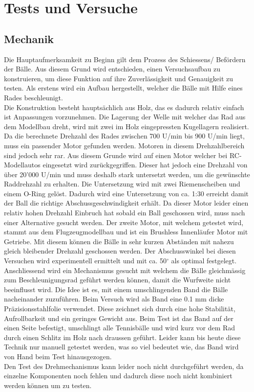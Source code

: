 \section{Tests und Versuche}

\subsection{Mechanik}

Die Hauptaufmerksamkeit zu Beginn gilt dem Prozess des Schiessens/ Befördern 
der Bälle. Aus diesem Grund wird entschieden, einen Versuchsaufbau zu 
konstruieren, um diese Funktion auf ihre Zuverlässigkeit und Genauigkeit zu 
testen. Als erstens wird ein Aufbau hergestellt, welcher die Bälle mit Hilfe 
eines Rades beschleunigt. \\
%
Die Konstruktion besteht hauptsächlich aus Holz, das es dadurch relativ 
einfach ist Anpassungen vorzunehmen. Die Lagerung der Welle mit welcher das 
Rad aus dem Modellbau dreht, wird mit zwei im Holz eingepressten Kugellagern 
realisiert. Da die berechnete Drehzahl des Rades zwischen 700 U/min bis 900 
U/min liegt, muss ein passender Motor gefunden werden. Motoren in diesem 
Drehzahlbereich sind jedoch sehr rar. Aus diesem Grunde wird auf einen Motor 
welcher bei RC-Modellautos eingesetzt wird zurückgegriffen. Dieser hat jedoch 
eine Drehzahl von über 20'000 U/min und muss deshalb stark untersetzt werden, 
um die gewünschte Raddrehzahl zu erhalten. Die Untersetzung wird mit zwei 
Riemenscheiben und einem O-Ring gelöst. Dadurch wird eine Untersetzung von 
ca. 1:30 erreicht damit der Ball die richtige Abschussgeschwindigkeit erhält. 
Da dieser Motor leider einen relativ hohen Drehzahl Einbruch hat sobald ein 
Ball geschossen wird, muss nach einer Alternative gesucht werden. Der 
zweite Motor, mit welchem getestet wird, stammt aus dem Flugzeugmodellbau und 
ist ein Brushless Innenläufer Motor mit Getriebe. Mit diesem können die 
Bälle in sehr kurzen Abständen mit nahezu gleich bleibender Drehzahl geschossen 
werden. Der Abschusswinkel bei diesen Versuchen wird experimentell ermittelt 
und mit ca. 50$^\circ$ als optimal festgelegt. \\
%
Anschliessend wird ein Mechanismus gesucht mit welchem die Bälle 
gleichmässig zum Beschleunigungsrad geführt werden können, damit die Wurfweite 
nicht beeinflusst wird. Die Idee ist es, mit einem umschlingenden Band die 
Bälle nacheinander zuzuführen. Beim Versuch wird als Band eine 0.1 mm dicke 
Präzisionsstahlfolie verwendet. Diese zeichnet sich durch eine hohe Stabilität, 
Aufrollbarkeit und ein geringes Gewicht aus. Beim Test ist das Band auf der 
einen Seite befestigt, umschlingt alle Tennisbälle und wird kurz vor dem Rad 
durch einen Schlitz im Holz nach draussen geführt. Leider kann bis heute 
diese Technik nur manuell getestet werden, was so viel bedeutet wie, das Band 
wird von Hand beim Test hinausgezogen. \\
%
Den Test des Drehmechanismus kann leider noch nicht durchgeführt werden, da 
einzelne Komponenten noch fehlen und dadurch diese noch nicht kombiniert 
werden können um zu testen.

